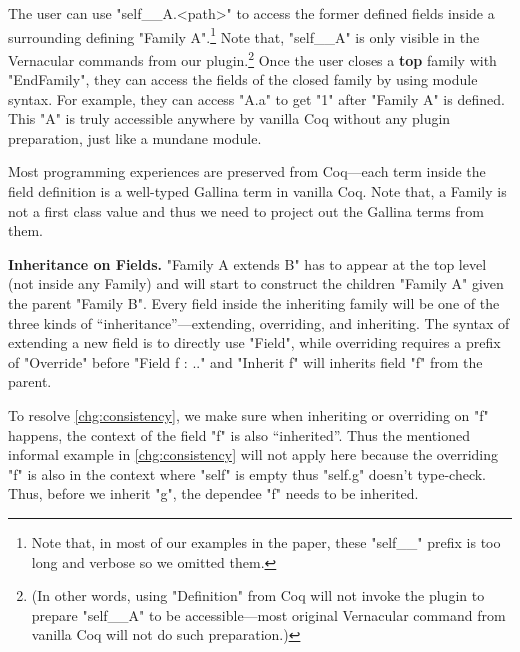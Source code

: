 The user can use "self__A.<path>" to access the former defined fields inside a surrounding defining "Family A".\footnote{Note that, in most of our examples in the paper, these "self__" prefix is too long and verbose so we omitted them.} Note that, "self__A" is only visible in the Vernacular commands from our plugin.\footnote{(In other words, using "Definition" from Coq will not invoke the plugin to prepare "self__A" to be accessible---most original Vernacular command from vanilla Coq will not do such preparation.)}  Once the user closes a \textbf{top} family with "EndFamily", they can access the fields of the closed family by using module syntax. For example, they can access "A.a" to get "1" after "Family A" is defined. This "A" is truly accessible anywhere by vanilla Coq without any plugin preparation, just like a mundane module.

Most programming experiences are preserved from Coq---each term inside the field definition is a well-typed Gallina term in vanilla Coq. Note that, a Family is not a first class value and thus we need to project out the Gallina terms from them.

\textbf{Inheritance on Fields.} "Family A extends B" has to appear at the top level (not inside any Family) and will start to construct the children "Family A" given the parent "Family B". Every field inside the inheriting family will be one of the three kinds of ``inheritance''---extending, overriding, and inheriting. The syntax of extending a new field is to directly use "Field", while overriding requires a prefix of "Override" before "Field f : .." and "Inherit f" will inherits field "f" from the parent. 

To resolve \ref{chg:consistency}, we make sure when inheriting or overriding on "f" happens, the context of the field "f" is also ``inherited''. Thus the mentioned informal example in \ref{chg:consistency} will not apply here because the overriding "f" is also in the context where "self" is empty thus "self.g" doesn't type-check. Thus, before we inherit "g", the dependee "f" needs to be inherited.  


